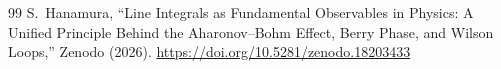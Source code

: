 \documentclass[12pt,letterpaper]{article}
\begin{document}
\begin{thebibliography}{99}
S.~Hanamura, ``Line Integrals as Fundamental Observables in Physics: A Unified Principle Behind the Aharonov--Bohm Effect, Berry Phase, and Wilson Loops,'' Zenodo (2026). \href{https://doi.org/10.5281/zenodo.18203433}{https://doi.org/10.5281/zenodo.18203433}


\end{thebibliography}
\end{document}
